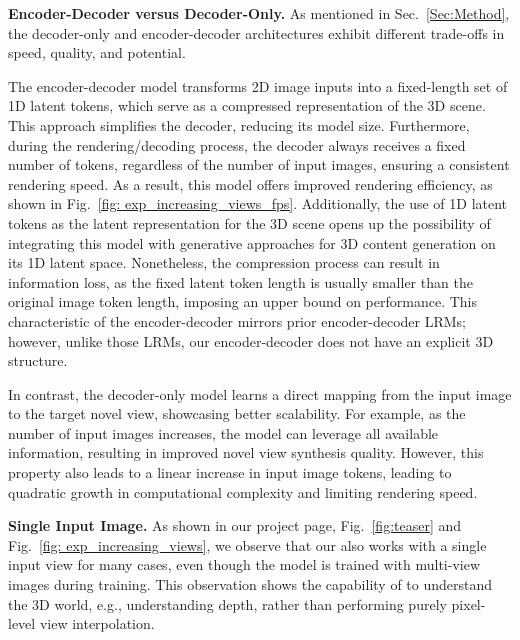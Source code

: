 \textbf{Encoder-Decoder versus Decoder-Only.}
As mentioned in Sec.~\ref{Sec:Method}, the decoder-only and encoder-decoder architectures exhibit different trade-offs in speed, quality, and potential.

The encoder-decoder model transforms 2D image inputs into a fixed-length set of 1D latent tokens, which serve as a compressed representation of the 3D scene. This approach simplifies the decoder, reducing its model size. Furthermore, during the rendering/decoding process, the decoder always receives a fixed number of tokens, regardless of the number of input images, ensuring a consistent rendering speed. As a result, this model offers improved rendering efficiency, as shown in Fig.~\ref{fig: exp_increasing_views_fps}. Additionally, the use of 1D latent tokens as the latent representation for the 3D scene opens up the possibility of integrating this model with generative approaches for 3D content generation on its 1D latent space.
Nonetheless, the compression process can result in information loss, as the fixed latent token length is usually smaller than the original image token length, imposing an upper bound on performance. This characteristic of the encoder-decoder \paperName{} mirrors prior encoder-decoder LRMs; however, unlike those LRMs, our encoder-decoder \paperName{} does not have an explicit 3D structure.

In contrast, the decoder-only model learns a direct mapping from the input image to the target novel view, showcasing better scalability. 
For example, as the number of input images increases, the model can leverage all available information, resulting in improved novel view synthesis quality. 
However, this property also leads to a linear increase in input image tokens, leading to quadratic growth in computational complexity and limiting rendering speed.

\textbf{Single Input Image.} As shown in our project page, Fig.~\ref{fig:teaser} and Fig.~\ref{fig: exp_increasing_views}, we observe that our \paperName{} also works with a single input view for many cases, even though the model is trained with multi-view images during training. This observation shows the capability of \paperName{} to understand the 3D world, e.g., understanding depth, rather than performing purely pixel-level view interpolation.
 


